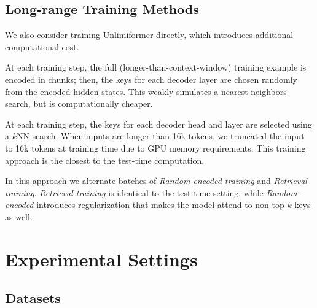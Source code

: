 \documentclass{article}
\newcommand{\ours}{Unlimiformer\xspace}
\begin{document}
\subsection{Long-range Training Methods}
We also consider training \ours directly, which introduces  additional computational cost.  %

\begin{description}[noitemsep]
    \item[\textit{Random-encoded training:}] At each training step, the full (longer-than-context-window) training example is encoded in chunks; then, the keys for each decoder layer are chosen randomly from the encoded hidden states. This weakly simulates a nearest-neighbors search, but is  computationally cheaper.
    \item[\textit{Retrieval training:}] At each training step, the keys for each decoder head and layer are selected using a $k$NN search. 
    When inputs are longer than 16k tokens, we truncated the input to 16k tokens at training time due to GPU memory requirements.
    This training approach is the closest to the test-time computation.
    \item[\textit{Alternating training:}] In this approach we alternate batches of \textit{Random-encoded training} and \textit{Retrieval training}. \emph{Retrieval training} is identical to the test-time setting, while \emph{Random-encoded} introduces regularization that makes the model attend to non-top-$k$ keys as well.
\end{description}



\section{Experimental Settings}


\subsection{Datasets}
\end{document}
